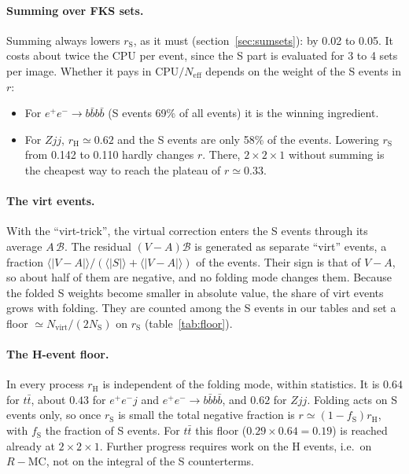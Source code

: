 \documentclass[11pt,a4paper]{article}
\newcommand{\rS}{r_{\mathrm S}}
\newcommand{\rH}{r_{\mathrm H}}
\newcommand{\Neff}{N_{\mathrm{eff}}}
\begin{document}
\paragraph{Summing over FKS sets.}
Summing always lowers $\rS$, as it must (section~\ref{sec:sumsets}): by 0.02 to 0.05. It
costs about twice the CPU per event, since the S part is evaluated for 3 to 4 sets per image.
Whether it pays in CPU$/\Neff$ depends on the weight of the S events in $r$:
\begin{itemize}
\item For $e^+e^-\to b\bar b b\bar b$ (S events 69\% of all events) it is the winning
ingredient.
\item For $Zjj$, $\rH\simeq0.62$ and the S events are only 58\% of the events. Lowering
$\rS$ from 0.142 to 0.110 hardly changes $r$. There, $2\times2\times1$ without summing is
the cheapest way to reach the plateau of $r\simeq0.33$.
\end{itemize}

\paragraph{The virt events.}
With the ``virt-trick'', the virtual correction enters the S events through its average
$A\,\mathcal B$. The residual $(V-A)\mathcal B$ is generated as separate ``virt'' events, a
fraction $\langle|V-A|\rangle/(\langle|S|\rangle+\langle|V-A|\rangle)$ of the events. Their sign is that of $V-A$, so about
half of them are negative, and no folding mode changes them. Because the folded S weights
become smaller in absolute value, the share of virt events grows with folding. They are
counted among the S events in our tables and set a floor $\simeq N_{\mathrm{virt}}/(2N_{\mathrm S})$
on $\rS$ (table~\ref{tab:floor}).

\paragraph{The H-event floor.}
In every process $\rH$ is independent of the folding mode, within statistics. It is $0.64$
for $t\bar t$, about $0.43$ for $e^+e^-j$ and $e^+e^-\to b\bar b b\bar b$, and $0.62$ for $Zjj$.
Folding acts on S events only, so once $\rS$ is small the total negative fraction is
$r\simeq(1-f_{\mathrm S})\rH$, with $f_{\mathrm S}$ the fraction of S events. For $t\bar t$ this floor
($0.29\times0.64=0.19$) is reached already at $2\times2\times1$. Further progress requires
work on the H events, i.e.\ on $R-\mathrm{MC}$, not on the integral of the S counterterms.
\end{document}
